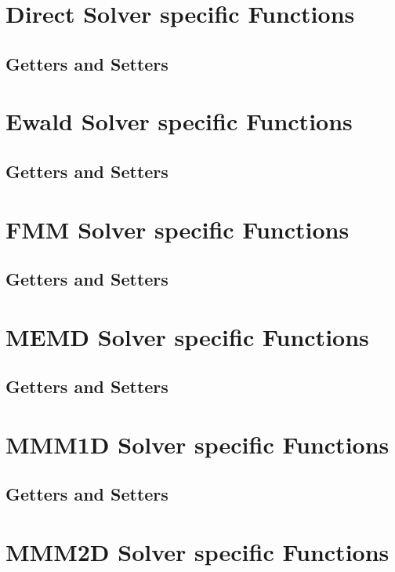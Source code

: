 \FloatBarrier
\section{Direct Solver specific Functions}


\FloatBarrier
\subsection{Getters and Setters}

\FloatBarrier
\section{Ewald Solver specific Functions}


\FloatBarrier
\subsection{Getters and Setters}

\FloatBarrier
\section{FMM Solver specific Functions}


\FloatBarrier
\subsection{Getters and Setters}

\FloatBarrier
\section{MEMD Solver specific Functions}


\FloatBarrier
\subsection{Getters and Setters}

\FloatBarrier
\section{MMM1D Solver specific Functions}


\FloatBarrier
\subsection{Getters and Setters}

\FloatBarrier
\section{MMM2D Solver specific Functions}


